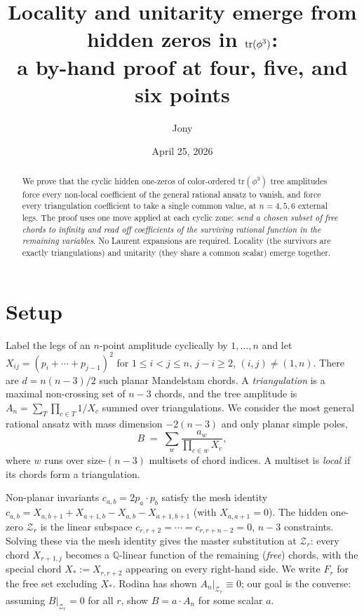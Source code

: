 \documentclass[11pt]{article}
\title{Locality and unitarity emerge from hidden zeros in $\tphi$:\\
a by-hand proof at four, five, and six points}
\author{Jony}
\date{April 25, 2026}
\newcommand{\tphi}{\mathrm{tr}(\phi^3)}
\newcommand{\Zr}{\mathcal{Z}}
\newcommand{\Fr}{F}
\begin{document}
\maketitle

\begin{abstract}
We prove that the cyclic hidden one-zeros of color-ordered
$\tphi$ tree amplitudes force every non-local coefficient of the
general rational ansatz to vanish, and force every triangulation
coefficient to take a single common value, at $n=4,5,6$ external
legs.  The proof uses one move applied at each cyclic zone:
\emph{send a chosen subset of free chords to infinity and read off
coefficients of the surviving rational function in the remaining
variables}.  No Laurent expansions are required.  Locality (the
survivors are exactly triangulations) and unitarity (they share a
common scalar) emerge together.
\end{abstract}

\section{Setup}

Label the legs of an $n$-point amplitude cyclically by $1,\dots,n$
and let $X_{ij}=(p_i+\cdots+p_{j-1})^2$ for $1\le i<j\le n$, $j-i\ge 2$,
$(i,j)\ne(1,n)$.  There are $d=n(n-3)/2$ such planar Mandelstam
chords.  A \emph{triangulation} is a maximal non-crossing set of
$n-3$ chords, and the tree amplitude is
$A_n = \sum_{T}\prod_{c\in T}1/X_c$ summed over triangulations.
We consider the most general rational ansatz with mass dimension
$-2(n-3)$ and only planar simple poles,
\begin{equation}\label{eq:ansatz}
B \;=\; \sum_{w}\frac{a_w}{\prod_{c\in w}X_c},
\end{equation}
where $w$ runs over size-$(n-3)$ multisets of chord indices.  A
multiset is \emph{local} if its chords form a triangulation.

Non-planar invariants $c_{a,b}=2p_a\cdot p_b$ satisfy the mesh identity
$c_{a,b}=X_{a,b+1}+X_{a+1,b}-X_{a,b}-X_{a+1,b+1}$ (with $X_{a,a+1}=0$).
The hidden one-zero $\Zr_r$ is the linear subspace
$c_{r,r+2}=\cdots=c_{r,r+n-2}=0$, $n-3$ constraints.  Solving these
via the mesh identity gives the master substitution at $\Zr_r$:
every chord $X_{r+1,j}$ becomes a $\mathbb{Q}$-linear function of
the remaining (\emph{free}) chords, with the special chord
$X_*:=X_{r,r+2}$ appearing on every right-hand side.  We write
$\Fr_r$ for the free set excluding $X_*$.  Rodina has shown
$A_n|_{\Zr_r}\equiv0$; our goal is the converse: assuming
$B|_{\Zr_r}=0$ for all $r$, show $B=a\cdot A_n$ for some scalar $a$.
\end{document}
